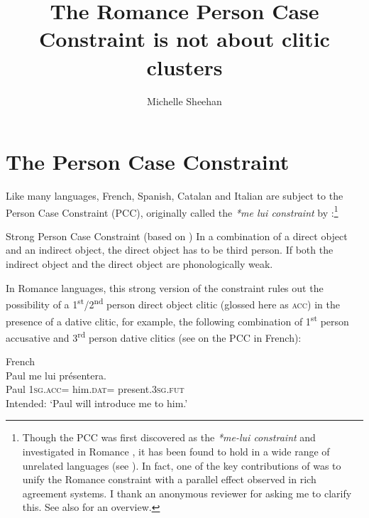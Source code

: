 \documentclass[output=paper,colorlinks,citecolor=brown,nonflat]{langsci/langscibook}
\author{Michelle Sheehan	\affiliation{Anglia Ruskin University}}
\title{The Romance Person Case Constraint is not about clitic clusters}
\begin{document}
\maketitle

\section{The Person Case Constraint}\label{sec:sheehan:1}

Like many languages, French, Spanish, Catalan and Italian are subject to the Person Case Constraint (PCC), originally called the \textit{*me lui constraint} by \citet{Perlmutter1971}:\footnote{Though the PCC was first discovered as the \textit{*me-lui constraint} and investigated in Romance \citep{Perlmutter1971}, it has been found to hold in a wide range of unrelated languages (see \citealt{Bonet1991, Albizu1997, Rezac2008, Haspelmath2004, AdgerHarbour2007}). In fact, one of the key contributions of \citet{Bonet1991} was to unify the Romance constraint with a parallel effect observed in rich agreement systems. I thank an anonymous reviewer for asking me to clarify this. See also \citet{Bonet2007} for an overview.}

\ea%
    \label{ex:sheehan:1}
    Strong Person Case Constraint (based on \citealt[181--182]{Bonet1991})
    \ea\label{ex:sheehan:1a}
    In a combination of a direct object and an indirect object, the direct object has to be third person.
    \ex\label{ex:sheehan:1b}
    If both the indirect object and the direct object are phonologically weak.
    \z
\z

In Romance languages, this strong version of the constraint rules out the possibility of a 1\textsuperscript{st}/2\textsuperscript{nd} person direct object clitic (glossed here as \textsc{acc}) in the presence of a dative clitic, for example, the following combination of 1\textsuperscript{st} person accusative and 3\textsuperscript{rd} person dative clitics (see \citealt{Perlmutter1971, Kayne1975, Postal1981} on the PCC in French):

\ea%
    \label{ex:sheehan:2}
    French \citep[173]{Kayne1975}\\
    \gll    *Paul   me       lui       présentera.\\
            Paul   \textsc{1sg}.\textsc{acc}=   him.\textsc{dat=} present.\textsc{3sg.fut}\\
    \glt    Intended: ‘Paul will introduce me to him.’
\z
\end{document}
